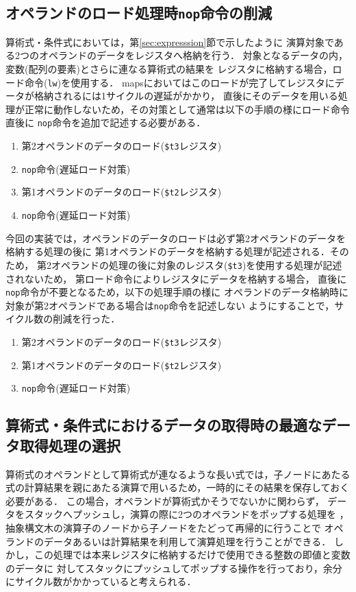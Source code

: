 \subsection{オペランドのロード処理時\texttt{nop}命令の削減}
算術式・条件式においては，第\ref{sec:expresssion}節で示したように
演算対象である2つのオペランドのデータをレジスタへ格納を行う．
対象となるデータの内，変数(配列の要素)とさらに連なる算術式の結果を
レジスタに格納する場合，ロード命令(\verb|lw|)を使用する．
mapsにおいてはこのロードが完了してレジスタにデータが格納されるには1サイクルの遅延がかかり，
直後にそのデータを用いる処理が正常に動作しないため，その対策として通常は以下の手順の様にロード命令直後に
\verb|nop|命令を追加で記述する必要がある．

\begin{enumerate}
  \item 第2オペランドのデータのロード(\verb|$t3|レジスタ)
  \item \verb|nop|命令(遅延ロード対策)
  \item 第1オペランドのデータのロード(\verb|$t2|レジスタ)
  \item \verb|nop|命令(遅延ロード対策)
\end{enumerate}

今回の実装では，オペランドのデータのロードは必ず第2オペランドのデータを格納する処理の後に
第1オペランドのデータを格納する処理が記述される．そのため，
第2オペランドの処理の後に対象のレジスタ(\verb|$t3|)を使用する処理が記述されないため，
第ロード命令によりレジスタにデータを格納する場合，
直後に\verb|nop|命令が不要となるため，以下の処理手順の様に
オペランドのデータ格納時に対象が第2オペランドである場合は\verb|nop|命令を記述しない
ようにすることで，サイクル数の削減を行った．

\begin{enumerate}
  \item 第2オペランドのデータのロード(\verb|$t3|レジスタ)
  \item 第1オペランドのデータのロード(\verb|$t2|レジスタ)
  \item \verb|nop|命令(遅延ロード対策)
\end{enumerate}

\subsection{算術式・条件式におけるデータの取得時の最適なデータ取得処理の選択}
算術式のオペランドとして算術式が連なるような長い式では，子ノードにあたる
式の計算結果を親にあたる演算で用いるため，一時的にその結果を保存しておく必要がある．
この場合，オペランドが算術式かそうでないかに関わらず，
データをスタックへプッシュし，演算の際に2つのオペランドをポップする処理を
，抽象構文木の演算子のノードから子ノードをたどって再帰的に行うことで
オペランドのデータあるいは計算結果を利用して演算処理を行うことができる．
しかし，この処理では本来レジスタに格納するだけで使用できる整数の即値と変数のデータに
対してスタックにプッシュしてポップする操作を行っており，余分にサイクル数がかかっていると考えられる．

